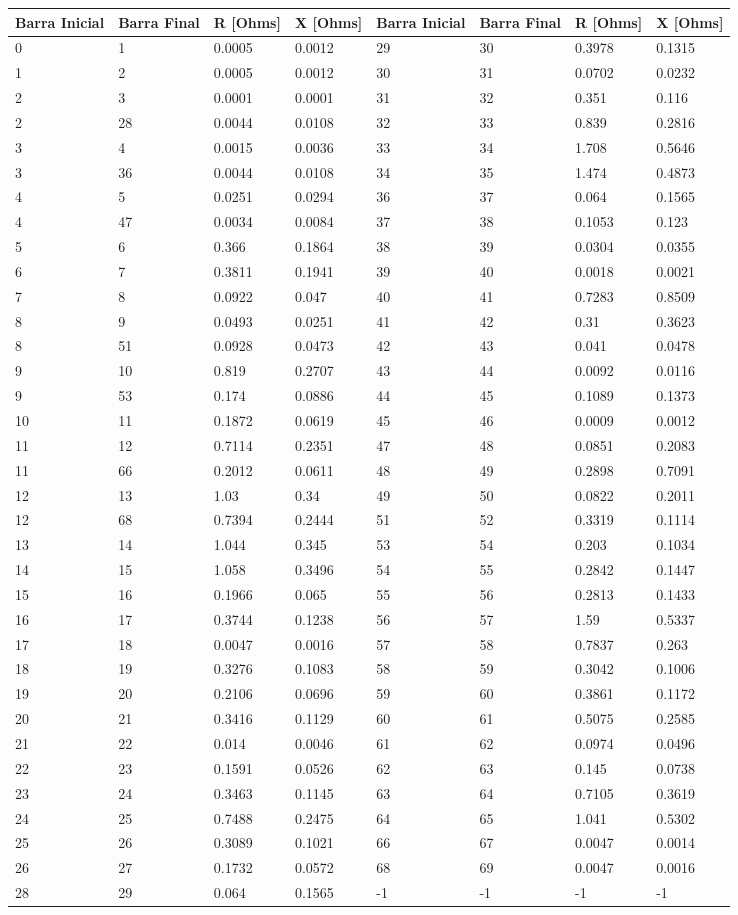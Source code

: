 \begin{tabular}{llllllll}
\toprule
\textbf{Barra Inicial}&\textbf{Barra Final}&\textbf{R [Ohms]}&\textbf{X [Ohms]}&\textbf{Barra Inicial}&\textbf{Barra Final}&\textbf{R [Ohms]}&\textbf{X [Ohms]}\\
\midrule
0&1&0.0005&0.0012&29&30&0.3978&0.1315\\
1&2&0.0005&0.0012&30&31&0.0702&0.0232\\
2&3&0.0001&0.0001&31&32&0.351&0.116\\
2&28&0.0044&0.0108&32&33&0.839&0.2816\\
3&4&0.0015&0.0036&33&34&1.708&0.5646\\
3&36&0.0044&0.0108&34&35&1.474&0.4873\\
4&5&0.0251&0.0294&36&37&0.064&0.1565\\
4&47&0.0034&0.0084&37&38&0.1053&0.123\\
5&6&0.366&0.1864&38&39&0.0304&0.0355\\
6&7&0.3811&0.1941&39&40&0.0018&0.0021\\
7&8&0.0922&0.047&40&41&0.7283&0.8509\\
8&9&0.0493&0.0251&41&42&0.31&0.3623\\
8&51&0.0928&0.0473&42&43&0.041&0.0478\\
9&10&0.819&0.2707&43&44&0.0092&0.0116\\
9&53&0.174&0.0886&44&45&0.1089&0.1373\\
10&11&0.1872&0.0619&45&46&0.0009&0.0012\\
11&12&0.7114&0.2351&47&48&0.0851&0.2083\\
11&66&0.2012&0.0611&48&49&0.2898&0.7091\\
12&13&1.03&0.34&49&50&0.0822&0.2011\\
12&68&0.7394&0.2444&51&52&0.3319&0.1114\\
13&14&1.044&0.345&53&54&0.203&0.1034\\
14&15&1.058&0.3496&54&55&0.2842&0.1447\\
15&16&0.1966&0.065&55&56&0.2813&0.1433\\
16&17&0.3744&0.1238&56&57&1.59&0.5337\\
17&18&0.0047&0.0016&57&58&0.7837&0.263\\
18&19&0.3276&0.1083&58&59&0.3042&0.1006\\
19&20&0.2106&0.0696&59&60&0.3861&0.1172\\
20&21&0.3416&0.1129&60&61&0.5075&0.2585\\
21&22&0.014&0.0046&61&62&0.0974&0.0496\\
22&23&0.1591&0.0526&62&63&0.145&0.0738\\
23&24&0.3463&0.1145&63&64&0.7105&0.3619\\
24&25&0.7488&0.2475&64&65&1.041&0.5302\\
25&26&0.3089&0.1021&66&67&0.0047&0.0014\\
26&27&0.1732&0.0572&68&69&0.0047&0.0016\\
28&29&0.064&0.1565&-1&-1&-1&-1\\
\bottomrule
\end{tabular}
